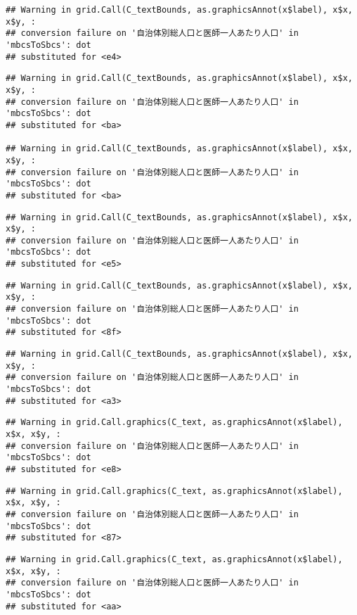 \documentclass[
]{article}
\begin{document}
\begin{verbatim}
## Warning in grid.Call(C_textBounds, as.graphicsAnnot(x$label), x$x, x$y, :
## conversion failure on '自治体別総人口と医師一人あたり人口' in 'mbcsToSbcs': dot
## substituted for <e4>
\end{verbatim}

\begin{verbatim}
## Warning in grid.Call(C_textBounds, as.graphicsAnnot(x$label), x$x, x$y, :
## conversion failure on '自治体別総人口と医師一人あたり人口' in 'mbcsToSbcs': dot
## substituted for <ba>

## Warning in grid.Call(C_textBounds, as.graphicsAnnot(x$label), x$x, x$y, :
## conversion failure on '自治体別総人口と医師一人あたり人口' in 'mbcsToSbcs': dot
## substituted for <ba>
\end{verbatim}

\begin{verbatim}
## Warning in grid.Call(C_textBounds, as.graphicsAnnot(x$label), x$x, x$y, :
## conversion failure on '自治体別総人口と医師一人あたり人口' in 'mbcsToSbcs': dot
## substituted for <e5>
\end{verbatim}

\begin{verbatim}
## Warning in grid.Call(C_textBounds, as.graphicsAnnot(x$label), x$x, x$y, :
## conversion failure on '自治体別総人口と医師一人あたり人口' in 'mbcsToSbcs': dot
## substituted for <8f>
\end{verbatim}

\begin{verbatim}
## Warning in grid.Call(C_textBounds, as.graphicsAnnot(x$label), x$x, x$y, :
## conversion failure on '自治体別総人口と医師一人あたり人口' in 'mbcsToSbcs': dot
## substituted for <a3>
\end{verbatim}

\begin{verbatim}
## Warning in grid.Call.graphics(C_text, as.graphicsAnnot(x$label), x$x, x$y, :
## conversion failure on '自治体別総人口と医師一人あたり人口' in 'mbcsToSbcs': dot
## substituted for <e8>
\end{verbatim}

\begin{verbatim}
## Warning in grid.Call.graphics(C_text, as.graphicsAnnot(x$label), x$x, x$y, :
## conversion failure on '自治体別総人口と医師一人あたり人口' in 'mbcsToSbcs': dot
## substituted for <87>
\end{verbatim}

\begin{verbatim}
## Warning in grid.Call.graphics(C_text, as.graphicsAnnot(x$label), x$x, x$y, :
## conversion failure on '自治体別総人口と医師一人あたり人口' in 'mbcsToSbcs': dot
## substituted for <aa>
\end{verbatim}
\end{document}
